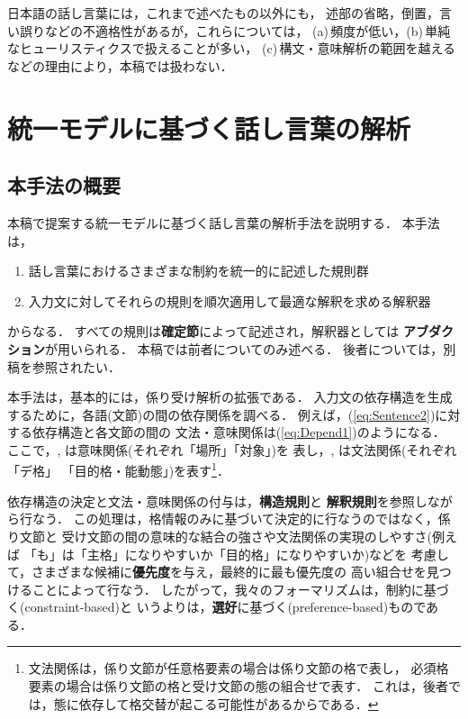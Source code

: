 日本語の話し言葉には，これまで述べたもの以外にも，
述部の省略，倒置，言い誤りなどの不適格性があるが，これらについては，
(a)\,頻度が低い，(b)\,単純なヒューリスティクスで扱えることが多い，
(c)\,構文・意味解析の範囲を越えるなどの理由により，本稿では扱わない．
\vspace*{-0.2mm}
\section{統一モデルに基づく話し言葉の解析}\label{sec:Uniform}
\vspace*{-0.2mm}

\vspace*{-0.2mm}
\subsection{本手法の概要}\label{sec:Uniform:Overview}
\vspace*{-0.2mm}

本稿で提案する統一モデルに基づく話し言葉の解析手法を説明する．
本手法は，
\begin{enumerate}
\renewcommand{\theenumi}{}
\renewcommand{\labelenumi}{}
  \item 話し言葉におけるさまざまな制約を統一的に記述した規則群
  \item 入力文に対してそれらの規則を順次適用して最適な解釈を求める解釈器
\end{enumerate}
からなる．
すべての規則は{\bf 確定節}によって記述され，解釈器としては
{\bf アブダクション}が用いられる．
本稿では前者についてのみ述べる．
後者については，別稿\cite{伝:情処論-35-12-2734}を参照されたい．

本手法は，基本的には，係り受け解析の拡張である．
入力文の依存構造を生成するために，各語(文節)の間の依存関係を調べる．
例えば，(\ref{eq:Sentence2})に対する依存構造と各文節の間の
文法・意味関係は(\ref{eq:Depend1})のようになる．
ここで，, は意味関係(それぞれ「場所」「対象」)を
表し，, は文法関係(それぞれ「デ格」
「目的格・能動態」)を表す\footnote{
  文法関係は，係り文節が任意格要素の場合は係り文節の格で表し，
必須格要素の場合は係り文節の格と受け文節の態の組合せで表す．
これは，後者では，態に依存して格交替が起こる可能性があるからである．
}．

依存構造の決定と文法・意味関係の付与は，{\bf 構造規則}と
{\bf 解釈規則}を参照しながら行なう．
この処理は，格情報のみに基づいて決定的に行なうのではなく，係り文節と
受け文節の間の意味的な結合の強さや文法関係の実現のしやすさ(例えば
「も」は「主格」になりやすいか「目的格」になりやすいか)などを
考慮して，さまざまな候補に{\bf 優先度}を与え，最終的に最も優先度の
高い組合せを見つけることによって行なう．
したがって，我々のフォーマリズムは，制約に基づく(constraint-based)と
いうよりは，{\bf 選好}に基づく(preference-based)ものである．

